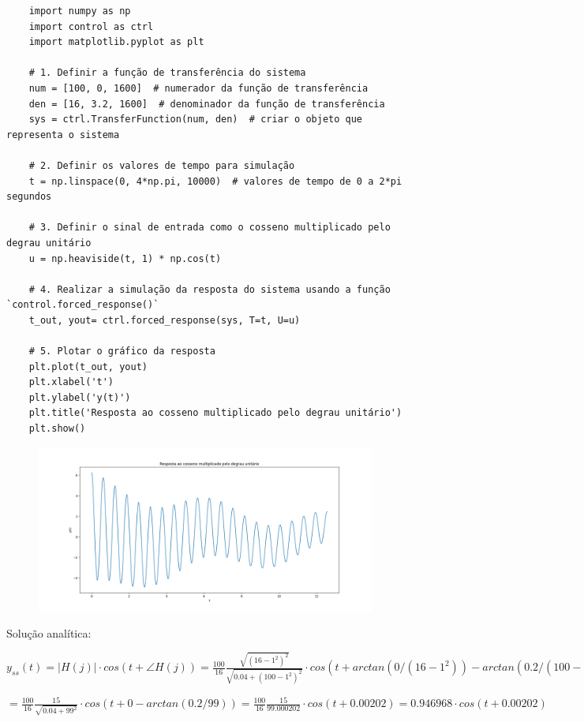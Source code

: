 \documentclass[10pt]{article}
\begin{document}
\begin{verbatim}
    import numpy as np
    import control as ctrl
    import matplotlib.pyplot as plt

    # 1. Definir a função de transferência do sistema
    num = [100, 0, 1600]  # numerador da função de transferência
    den = [16, 3.2, 1600]  # denominador da função de transferência
    sys = ctrl.TransferFunction(num, den)  # criar o objeto que representa o sistema

    # 2. Definir os valores de tempo para simulação
    t = np.linspace(0, 4*np.pi, 10000)  # valores de tempo de 0 a 2*pi segundos

    # 3. Definir o sinal de entrada como o cosseno multiplicado pelo degrau unitário
    u = np.heaviside(t, 1) * np.cos(t)

    # 4. Realizar a simulação da resposta do sistema usando a função `control.forced_response()`
    t_out, yout= ctrl.forced_response(sys, T=t, U=u)

    # 5. Plotar o gráfico da resposta
    plt.plot(t_out, yout)
    plt.xlabel('t')
    plt.ylabel('y(t)')
    plt.title('Resposta ao cosseno multiplicado pelo degrau unitário')
    plt.show()
\end{verbatim}

\newpage

\begin{figure}[h]
    \includegraphics[scale=0.4]{questao1.png}
    \centering
\end{figure}

Solução analítica:

$y_{ss}(t) = |H(j)| \cdot cos(t + \angle H(j)) = \frac{100}{16} \frac{\sqrt{(16-1^2)^2}}{\sqrt{0.04 + (100 - 1^2)^2}} \cdot cos(t + arctan(0/(16 - 1^2)) - arctan(0.2/(100 - 1^2))) =$

$= \frac{100}{16} \frac{15}{\sqrt{0.04 + 99^2}} \cdot cos(t + 0 - arctan(0.2/99)) = \frac{100}{16} \frac{15}{99.000202} \cdot cos(t + 0.00202) = 0.946968 \cdot cos(t + 0.00202)$
\end{document}
